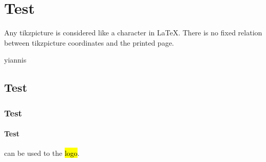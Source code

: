 \documentclass{book}
\begin{document}
\tableofcontents
\mainmatter

\chapter{Test}
\expandafter\epigraph{Any tikzpicture is considered like a character in LaTeX. There is no fixed relation between tikzpicture coordinates and the printed page.}{yiannis}
\lipsum
\section{Test}
\lipsum
\subsection{Test}
\lipsum
\subsubsection{Test}
\lipsum

\CMDI{\tex} can be used to  the \tex \hl{logo}.
\end{document}
